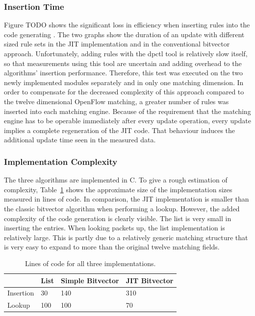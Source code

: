 \documentclass[a4paper,
		12pt,
		parskip=full,
		titlepage
		]{scrartcl}
\begin{document}
\subsubsection{Insertion Time}
Figure TODO shows the significant loss in efficiency when inserting rules into the code generating . %
The two graphs show the duration of an update with different sized rule sets in the JIT implementation and in the conventional bitvector approach.
Unfortunately, adding rules with the \textsf{dpctl} tool is relatively slow itself, so that measurements using this tool
are uncertain and adding overhead to the algorithms' insertion performance.
Therefore, this test was executed on the two newly implemented modules separately and in only one matching dimension.
In order to compensate for the decreased complexity of this approach compared to the twelve dimensional OpenFlow matching,
a greater number of rules was inserted into each matching engine.
Because of the requirement that the matching engine has to be operable 
immediately after every update operation, every update implies a complete regeneration of the JIT code.
That behaviour induces the additional update time seen in the measured data.

\subsubsection{Implementation Complexity}
The three algorithms are implemented in C.
To give a rough estimation of complexity, Table~\ref{table:loc} shows the 
approximate size of the implementation sizes measured in lines of code.
In comparison, the JIT implementation is smaller than the classic bitvector algorithm when performing a lookup.
However, the added complexity of the code generation is clearly visible.
The list is very small in inserting the entries.
When looking packets up, the list implementation is relatively large.
This is partly due to a relatively generic matching structure that is very 
easy to expand to more than the original twelve matching fields.

\begin{table}
  \centering
  \begin{tabularx}{\textwidth}{l|XXX}
  &List&Simple Bitvector&JIT Bitvector\\
  \hline
  Insertion&30&140&310\\
  Lookup&100&100&70\\
  \end{tabularx}
  \caption{Lines of code for all three implementations.}
  \label{table:loc}
\end{table}
\end{document}
